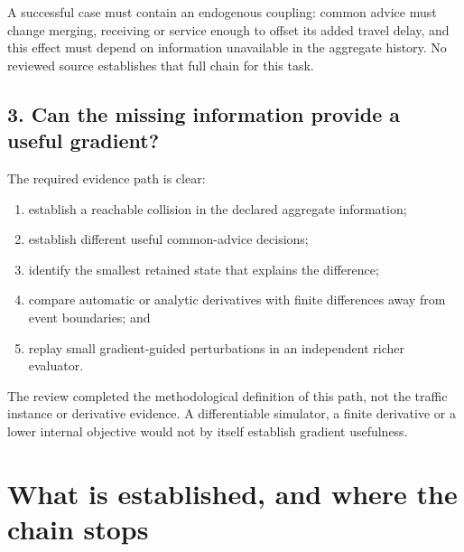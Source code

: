 \documentclass[10pt]{article}
\begin{document}
A successful case must contain an endogenous coupling: common advice must change
merging, receiving or service enough to offset its added travel delay, and this
effect must depend on information unavailable in the aggregate history. No
reviewed source establishes that full chain for this task.

\subsection{3. Can the missing information provide a useful gradient?}

The required evidence path is clear:

\begin{enumerate}
\item establish a reachable collision in the declared aggregate information;
\item establish different useful common-advice decisions;
\item identify the smallest retained state that explains the difference;
\item compare automatic or analytic derivatives with finite differences away
      from event boundaries; and
\item replay small gradient-guided perturbations in an independent richer
      evaluator.
\end{enumerate}

The review completed the methodological definition of this path, not the traffic
instance or derivative evidence. A differentiable simulator, a finite derivative
or a lower internal objective would not by itself establish gradient usefulness.

\section{What is established, and where the chain stops}
\end{document}
